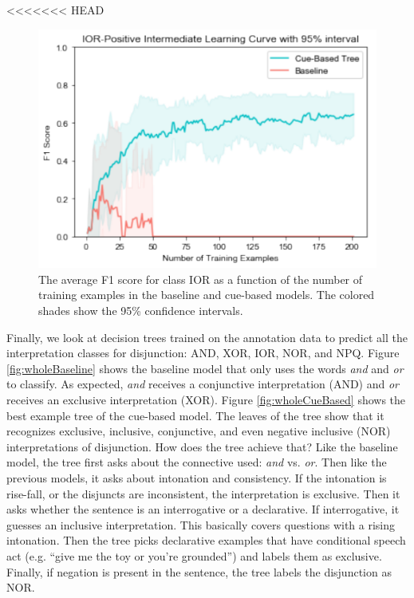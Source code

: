 \documentclass[,man,floatsintext]{apa6}
\begin{document}
<<<<<<< HEAD
\begin{figure}
\centering
\includegraphics{figs/IORintermediate-1.pdf}
\caption{\label{fig:IORintermediate}The average F1 score for class IOR as a function of the number of training examples in the baseline and cue-based models. The colored shades show the 95\% confidence intervals.}
\end{figure}

Finally, we look at decision trees trained on the annotation data to predict all the interpretation classes for disjunction: AND, XOR, IOR, NOR, and NPQ. Figure \ref{fig:wholeBaseline} shows the baseline model that only uses the words \emph{and} and \emph{or} to classify. As expected, \emph{and} receives a conjunctive interpretation (AND) and \emph{or} receives an exclusive interpretation (XOR). Figure \ref{fig:wholeCueBased} shows the best example tree of the cue-based model. The leaves of the tree show that it recognizes exclusive, inclusive, conjunctive, and even negative inclusive (NOR) interpretations of disjunction. How does the tree achieve that? Like the baseline model, the tree first asks about the connective used: \emph{and} vs. \emph{or}. Then like the previous models, it asks about intonation and consistency. If the intonation is rise-fall, or the disjuncts are inconsistent, the interpretation is exclusive. Then it asks whether the sentence is an interrogative or a declarative. If interrogative, it guesses an inclusive interpretation. This basically covers questions with a rising intonation. Then the tree picks declarative examples that have conditional speech act (e.g. \enquote{give me the toy or you're grounded}) and labels them as exclusive. Finally, if negation is present in the sentence, the tree labels the disjunction as NOR.
\end{document}

